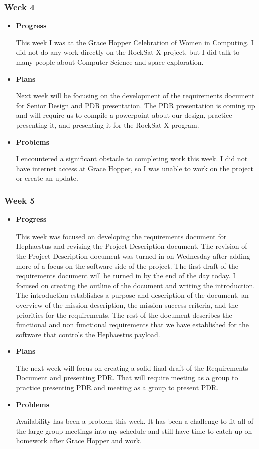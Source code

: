 \subsubsection{Week 4}
\begin{itemize}
\item{
\textbf{Progress}

This week I was at the Grace Hopper Celebration of Women in Computing. I did not do any work directly on the RockSat-X project, but I did talk to many people about Computer Science and space exploration.
}
\item{
\textbf{Plans}

Next week will be focusing on the development of the requirements document for Senior Design and PDR presentation. The PDR presentation is coming up and will require us to compile a powerpoint about our design, practice presenting it, and presenting it for the RockSat-X program.
}
\item{
\textbf{Problems}

I encountered a significant obstacle to completing work this week. I did not have internet access at Grace Hopper, so I was unable to work on the project or create an update.
}
\end{itemize}

\subsubsection{Week 5}
\begin{itemize}
\item{
\textbf{Progress}

This week was focused on developing the requirements document for Hephaestus and revising the Project Description document. The revision of the Project Description document was turned in on Wednesday after adding more of a focus on the software side of the project. The first draft of the requirements document will be turned in by the end of the day today. I focused on creating the outline of the document and writing the introduction. The introduction establishes a purpose and description of the document, an overview of the mission description, the mission success criteria, and the priorities for the requirements. The rest of the document describes the functional and non functional requirements that we have established for the software that controls the Hephaestus payload.
}
\item{
\textbf{Plans}

The next week will focus on creating a solid final draft of the Requirements Document and presenting PDR. That will require meeting as a group to practice presenting PDR and meeting as a group to present PDR.
}
\item{
\textbf{Problems}

Availability has been a problem this week. It has been a challenge to fit all of the large group meetings into my schedule and still have time to catch up on homework after Grace Hopper and work.
}
\end{itemize}

